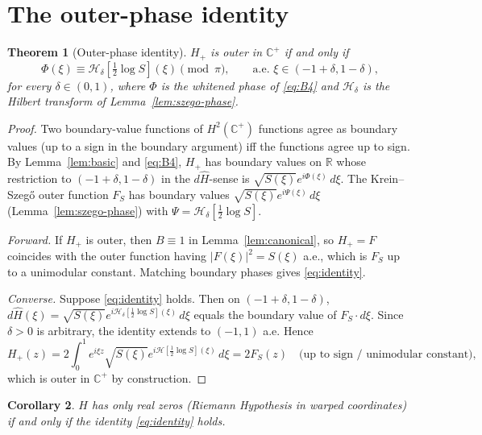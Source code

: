 \documentclass[11pt]{article}
\newtheorem{theorem}{Theorem}
\newtheorem{corollary}[theorem]{Corollary}
\theoremstyle{definition}
\newcommand{\R}{\mathbb{R}}
\newcommand{\C}{\mathbb{C}}
\newcommand{\Cpls}{\C^+}
\begin{document}
\section{The outer-phase identity}

\begin{theorem}[Outer-phase identity]\label{thm:main}
$H_+$ is outer in $\Cpls$ if and only if
\begin{equation}\label{eq:identity}
\Phi(\xi) \equiv \mathcal H_\delta\!\left[\tfrac12\log S\right]\!(\xi) \pmod{\pi}, \qquad \text{a.e. } \xi \in (-1+\delta, 1-\delta),
\end{equation}
for every $\delta \in (0,1)$, where $\Phi$ is the whitened phase of \eqref{eq:B4} and $\mathcal H_\delta$ is the Hilbert transform of Lemma~\ref{lem:szego-phase}.
\end{theorem}

\begin{proof}
Two boundary-value functions of $H^2(\Cpls)$ functions agree as boundary values (up to a sign in the boundary argument) iff the functions agree up to sign. By Lemma~\ref{lem:basic} and \eqref{eq:B4}, $H_+$ has boundary values on $\R$ whose restriction to $(-1+\delta, 1-\delta)$ in the $d\widehat H$-sense is $\sqrt{S(\xi)}e^{i\Phi(\xi)}\,d\xi$. The Krein--Szeg\H{o} outer function $F_S$ has boundary values $\sqrt{S(\xi)}e^{i\Psi(\xi)}\,d\xi$ (Lemma~\ref{lem:szego-phase}) with $\Psi = \mathcal H_\delta[\tfrac12\log S]$.

\emph{Forward.} If $H_+$ is outer, then $B \equiv 1$ in Lemma~\ref{lem:canonical}, so $H_+ = F$ coincides with the outer function having $|F(\xi)|^2 = S(\xi)$ a.e., which is $F_S$ up to a unimodular constant. Matching boundary phases gives \eqref{eq:identity}.

\emph{Converse.} Suppose \eqref{eq:identity} holds. Then on $(-1+\delta, 1-\delta)$, $d\widehat H(\xi) = \sqrt{S(\xi)}e^{i\mathcal H_\delta[\tfrac12\log S](\xi)}\,d\xi$ equals the boundary value of $F_S\cdot d\xi$. Since $\delta > 0$ is arbitrary, the identity extends to $(-1, 1)$ a.e. Hence
\[
H_+(z) = 2\int_0^1 e^{i\xi z}\sqrt{S(\xi)}e^{i\mathcal H[\tfrac12\log S](\xi)}\,d\xi = 2 F_S(z)\quad \text{(up to sign / unimodular constant)},
\]
which is outer in $\Cpls$ by construction.
\end{proof}

\begin{corollary}\label{cor:RH-equivalence}
$H$ has only real zeros (Riemann Hypothesis in warped coordinates) if and only if the identity \eqref{eq:identity} holds.
\end{corollary}
\end{document}
